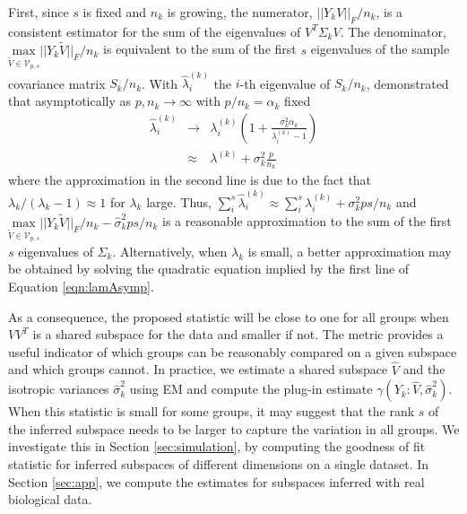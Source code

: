 \documentclass[12pt]{article}
\begin{document}
First, since $s$ is fixed and $n_k$ is growing, the numerator,
$||Y_kV||_F/n_k$, is a consistent estimator for the sum of the
eigenvalues of $V^T\Sigma_kV$.  The denominator,
$\underset{\widetilde{V} \in \mathcal{V}_{p,
    s}}{\text{max}}||Y_k\widetilde{V}||_F/n_k$
is equivalent to the sum of the first $s$ eigenvalues of the sample
covariance matrix $S_k/n_k$.  With $\hat{\lambda}^{(k)}_i$ the
$i$-th eigenvalue of $S_k/n_k$, \citet{Baik2006} demonstrated that
asymptotically as $p, n_k \rightarrow \infty$ with $p/n_k = \alpha_k$
fixed
%
\begin{eqnarray}
\nonumber \hat{\lambda}^{(k)}_i &\rightarrow& \lambda^{(k)}_i\left(1 +
                                    \frac{\sigma_k^2\alpha_k}{\lambda^{(k)}_i
                                    - 1}\right)\\
& \approx& \lambda^{(k)} + \sigma^2_k\frac{p}{n_k}
\label{eqn:lamAsymp}
\end{eqnarray}
%
\noindent where the approximation in the second line is due to the
fact that $\lambda_k/(\lambda_k - 1) \approx 1$ for $\lambda_k$ large.
Thus,
$\sum_i^s \hat{\lambda}^{(k)}_i \approx \sum_i^s \lambda^{(k)}_i +
\sigma_k^2ps/n_k$
and
$\underset{\widetilde{V} \in \mathcal{V}_{p, s}}{\text{max}}
||Y_k\widetilde{V}||_F/n_k - \hat{\sigma}_k^2ps/n_k$
is a reasonable approximation to the sum of the first $s$ eigenvalues
of $\Sigma_k$.  Alternatively, when $\lambda_k$ is small, a better
approximation may be obtained by solving the quadratic equation
implied by the first line of Equation \ref{eqn:lamAsymp}.

As a consequence, the proposed statistic will be close to one for all
groups when $VV^T$ is a shared subspace for the data and smaller if
not.  The metric provides a useful indicator of which groups can be
reasonably compared on a given subspace and which groups cannot.  In
practice, we estimate a shared subspace $\hat{V}$ and the isotropic
variances $\hat{\sigma}_k^2$ using EM and compute the plug-in
estimate $\gamma(Y_k: \hat{V}, \hat{\sigma}_k^2)$.  When this
statistic is small for some groups, it may suggest that the rank $s$
of the inferred subspace needs to be larger to capture the variation
in all groups. We investigate this in Section \ref{sec:simulation}, by
computing the goodness of fit statistic for inferred subspaces of
different dimensions on a single dataset. In Section \ref{sec:app}, we
compute the estimates for subspaces inferred with real biological
data.

\end{document}
